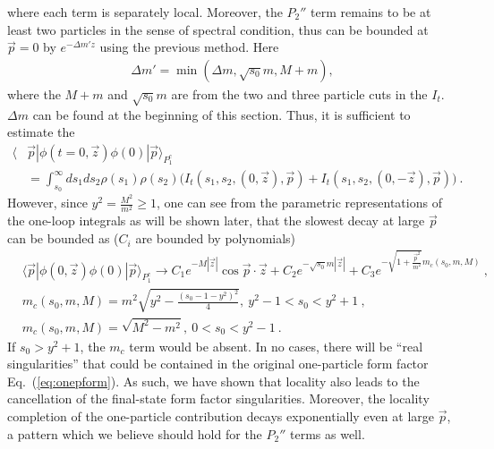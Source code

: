 \documentclass[a4paper,11pt]{article}
\begin{document}
where each term is separately local. Moreover, the $P_2''$ term remains to be at least two particles in the sense of spectral condition, thus can be bounded at $\vec{p}=0$ by $e^{-\Delta m' z}$ using the previous method. Here 
\begin{align}
\Delta m'=\min \left({\Delta m, \sqrt{s_0}m},M+m\right)  , 
\end{align}
where the $M+m$ and $\sqrt{s_0}m$ are from the two and three particle cuts in the $I_t$. $\Delta m$ can be found at the beginning of this section. Thus, it is sufficient to estimate the 
\begin{align}
\langle &\vec{p}|\phi(t=0,\vec{z})\phi(0)|\vec{p}\rangle_{P_1^c} \nonumber \\ 
&=\int_{s_0}^{\infty} ds_1ds_2 \rho(s_1)\rho(s_2) \bigg(I_t(s_1,s_2,(0,\vec{z}),\vec{p})+I_t(s_1,s_2,(0,-\vec{z}),\vec{p}) \bigg) \ . 
\end{align}
However, since $y^2=\frac{M^2}{m^2} \ge 1$, one can see from the parametric representations of the one-loop integrals as will be shown later, that the slowest decay at large $\vec{p}$ can be bounded as ($C_i$ are bounded by polynomials)
\begin{align}\label{eq:oneparbound}
&\langle\vec{p}|\phi(0,\vec{z})\phi(0)|\vec{p}\rangle_{P_1^c}\rightarrow C_1e^{-M|\vec{z}|} \cos \vec{p}\cdot \vec{z}+C_2e^{-\sqrt{s_0}m |\vec{z}|}+C_3e^{-\sqrt{1+\frac{\vec{p}^2}{m^2}}m_c(s_0,m,M)} \ , \\
& m_c(s_0,m,M)=m^2\sqrt{y^2-\frac{(s_0-1-y^2)^2}{4}} , \  y^2-1<s_0<y^2+1  \ , \\
&m_c(s_0,m,M)= \sqrt{M^2-m^2}, \  0<s_0<y^2-1 \ . 
\end{align}
If $s_0>y^2+1$, the $m_c$ term would be absent. In no cases, there will be ``real singularities'' that could be contained in the original one-particle form factor Eq.~(\ref{eq:onepform}). As such, we have shown that locality also leads to the cancellation of the final-state form factor singularities.  Moreover, the locality completion of the one-particle contribution decays exponentially even at large $\vec{p}$, a pattern which we believe should hold for the $P_2''$ terms as well. 
\end{document}
